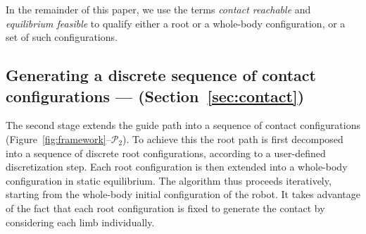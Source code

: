 \documentclass[journal]{IEEEtran}
\newcommand{\gls}[1]{\textit{#1}}
\newcommand{\glslink}[2]{{#2}}
\begin{document}

In the remainder of this paper, we use the terms \gls{contact reachable} and \gls{equilibrium feasible} to qualify either a root or a whole-body configuration, or a set
of such configurations.


\subsection{Generating a discrete sequence of contact configurations --- \Pb (Section~\ref{sec:contact})}
The second stage extends the guide path into a sequence of contact configurations (Figure~\ref{fig:framework}--$\mathcal{P}_2$).
To achieve this the root path is first decomposed into a sequence of discrete root configurations, according to a user-defined discretization step.
Each root configuration is then extended into a whole-body configuration in static equilibrium.
The algorithm thus proceeds iteratively, starting from the whole-body initial configuration of the robot.
It takes advantage of the fact that each root configuration is fixed to generate the contact by considering each limb individually. 


\end{document}
